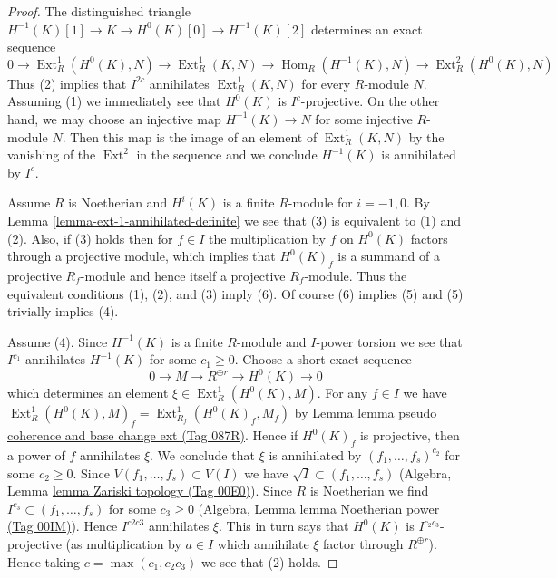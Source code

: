 \documentclass{amsart}
\theoremstyle{plain}
\theoremstyle{definition}
\theoremstyle{remark}
\numberwithin{equation}{subsection}
\def\Hom{\mathop{\mathrm{Hom}}\nolimits}
\def\Ext{\mathop{\mathrm{Ext}}\nolimits}
\begin{document}
\begin{proof}
The distinguished triangle $H^{-1}(K)[1] \to K \to H^0(K)[0] \to H^{-1}(K)[2]$
determines an exact sequence
$$
0 \to \Ext^1_R(H^0(K), N) \to \Ext^1_R(K, N) \to \Hom_R(H^{-1}(K), N) \to
\Ext^2_R(H^0(K), N)
$$
Thus (2) implies that $I^{2c}$ annihilates $\Ext^1_R(K, N)$ for every
$R$-module $N$. Assuming (1) we immediately see that $H^0(K)$ is
$I^c$-projective. On the other hand, we may choose an injective map
$H^{-1}(K) \to N$ for some injective $R$-module $N$. Then this map
is the image of an element of $\Ext^1_R(K, N)$ by the vanishing
of the $\Ext^2$ in the sequence and we conclude $H^{-1}(K)$
is annihilated by $I^c$.

\medskip\noindent
Assume $R$ is Noetherian and $H^i(K)$ is a finite $R$-module
for $i = -1, 0$. By Lemma \ref{lemma-ext-1-annihilated-definite}
we see that (3) is equivalent to (1) and (2). Also, if (3)
holds then for $f \in I$ the multiplication by $f$ on
$H^0(K)$ factors through a projective module, which implies
that $H^0(K)_f$ is a summand of a projective $R_f$-module and hence
itself a projective $R_f$-module. Thus the equivalent conditions
(1), (2), and (3) imply (6).
Of course (6) implies (5) and (5) trivially implies (4).

\medskip\noindent
Assume (4). Since $H^{-1}(K)$ is a finite $R$-module and $I$-power torsion
we see that $I^{c_1}$ annihilates $H^{-1}(K)$ for some $c_1 \geq 0$.
Choose a short exact sequence
$$
0 \to M \to R^{\oplus r} \to H^0(K) \to 0
$$
which determines an element $\xi \in \Ext^1_R(H^0(K), M)$.
For any $f \in I$ we have $\Ext^1_R(H^0(K), M)_f = \Ext^1_{R_f}(H^0(K)_f, M_f)$
by Lemma \href{https://stacks.math.columbia.edu/tag/087R}{lemma pseudo coherence and base change ext (Tag 087R)}.
Hence if $H^0(K)_f$ is projective, then a power of $f$ annihilates $\xi$.
We conclude that $\xi$ is annihilated by $(f_1, \ldots, f_s)^{c_2}$
for some $c_2 \geq 0$. Since $V(f_1, \ldots, f_s) \subset V(I)$ we have
$\sqrt{I} \subset (f_1, \ldots, f_s)$
(Algebra, Lemma \href{https://stacks.math.columbia.edu/tag/00E0}{lemma Zariski topology (Tag 00E0)}).
Since $R$ is Noetherian we find $I^{c_3} \subset (f_1, \ldots, f_s)$
for some $c_3 \geq 0$ (Algebra, Lemma \href{https://stacks.math.columbia.edu/tag/00IM}{lemma Noetherian power (Tag 00IM)}).
Hence $I^{c2c3}$ annihilates $\xi$.
This in turn says that $H^0(K)$ is $I^{c_2c_3}$-projective (as multiplication
by $a \in I$ which annihilate $\xi$ factor through $R^{\oplus r}$).
Hence taking $c = \max(c_1, c_2c_3)$ we see that (2) holds.
\end{proof}
\end{document}
